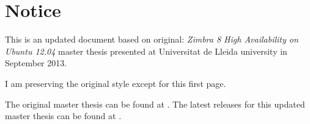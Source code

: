 \clearpage{}  %

\section*{Notice}

This is an updated document based on original:
\textit{Zimbra 8 High Availability on Ubuntu 12.04} master thesis presented at Universitat de Lleida university in September 2013.

I am preserving the original style except for this first page.

The original master thesis can be found at \cite{ZimbraHAMasterThesis}.
The latest releases for this updated master thesis can be found at 
\cite{ZimbraHAMasterThesisReleases}.
\newpage
